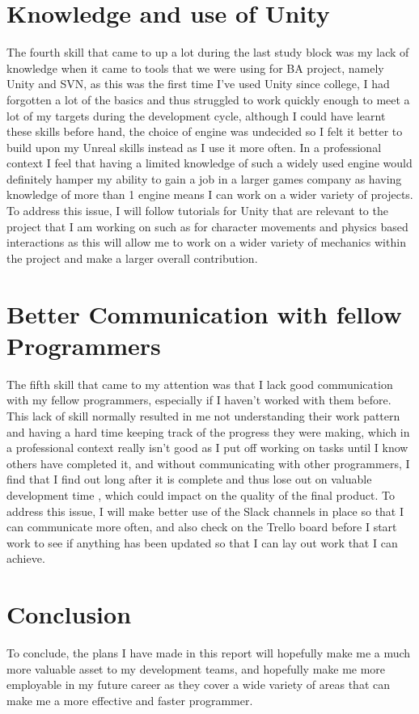 \documentclass{scrartcl}
\begin{document}
\section{Knowledge and use of Unity}
 The fourth skill that came to up a lot during the last study block was my lack of knowledge when it came to tools that we were using for BA project, namely Unity and SVN, as this was the first time I've used Unity since college, I had forgotten a lot of the basics and thus struggled to work quickly enough to meet a lot of my targets during the development cycle, although I could have learnt these skills before hand, the choice of engine was undecided so I felt it better to build upon my Unreal skills instead as I use it more often. In a professional context I feel that having a limited knowledge of such a widely used engine would definitely hamper my ability to gain a job in a larger games company as having knowledge of more than 1 engine means I can work on a wider variety of projects. To address this issue, I will follow tutorials for Unity that are relevant to the project that I am working on such as for character movements and physics based interactions as this will allow me to work on a wider variety of mechanics within the project and make a larger overall contribution. 

\section{Better Communication with fellow Programmers}
The fifth skill that came to my attention was that I lack good communication with my fellow programmers, especially if I haven't worked with them before. This lack of skill normally resulted in me not understanding their work pattern and having a hard time keeping track of the progress they were making, which in a professional context really isn't good as I put off working on tasks until I know others have completed it, and without communicating with other programmers, I find that I find out long after it is complete and thus lose out on valuable development time , which could impact on the quality of the final product. To address this issue, I will make better use of the Slack channels in place so that I can communicate more often, and also check on the Trello board before I start work to see if anything has been updated so that I can lay out work that I can achieve. 

\section{Conclusion}
To conclude, the plans I have made in this report will hopefully make me a much more valuable asset to my development teams, and hopefully make me more employable in my future career as they cover a wide variety of areas that can make me a more effective and faster programmer.







\end{document}
